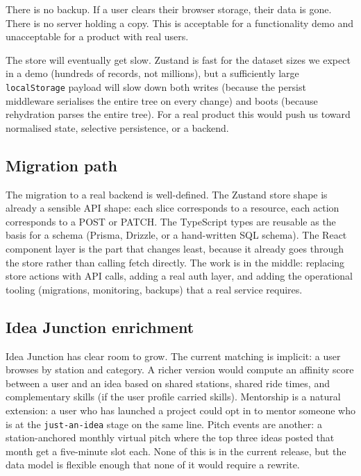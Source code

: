 \documentclass[a4paper,11pt]{article}
\begin{document}
There is no backup. If a user clears their browser storage, their data is
gone. There is no server holding a copy. This is acceptable for a
functionality demo and unacceptable for a product with real users.

The store will eventually get slow. Zustand is fast for the dataset sizes we
expect in a demo (hundreds of records, not millions), but a sufficiently
large \texttt{localStorage} payload will slow down both writes (because the
persist middleware serialises the entire tree on every change) and boots
(because rehydration parses the entire tree). For a real product this would
push us toward normalised state, selective persistence, or a backend.

\subsection{Migration path}

The migration to a real backend is well-defined. The Zustand store shape is
already a sensible API shape: each slice corresponds to a resource, each
action corresponds to a POST or PATCH. The TypeScript types are reusable as
the basis for a schema (Prisma, Drizzle, or a hand-written SQL schema). The
React component layer is the part that changes least, because it already goes
through the store rather than calling fetch directly. The work is in the
middle: replacing store actions with API calls, adding a real auth layer,
and adding the operational tooling (migrations, monitoring, backups) that a
real service requires.

\subsection{Idea Junction enrichment}

Idea Junction has clear room to grow. The current matching is implicit: a
user browses by station and category. A richer version would compute an
affinity score between a user and an idea based on shared stations, shared
ride times, and complementary skills (if the user profile carried skills).
Mentorship is a natural extension: a user who has launched a project could
opt in to mentor someone who is at the \texttt{just-an-idea} stage on the
same line. Pitch events are another: a station-anchored monthly virtual
pitch where the top three ideas posted that month get a five-minute slot
each. None of this is in the current release, but the data model is flexible
enough that none of it would require a rewrite.
\end{document}
